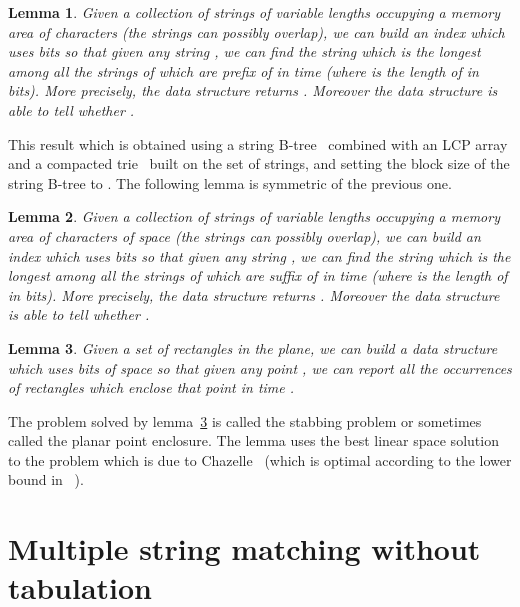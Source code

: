 \documentclass{article}
\newcommand{\?}{\mskip1.5mu}
\newtheorem{lemma}{Lemma}
\begin{document}
\begin{lemma}\cite[Theorem~1]{CHSV08}
\label{lemma3a}
Given a collection  of  strings of variable lengths occupying a memory area of  characters (the strings can possibly overlap), we can build an index which uses  bits so that given any string , we can find the string  which is the longest among all the strings of  which are prefix of  in time  (where  is the length of  in bits). More precisely, the data structure returns .
Moreover the data structure is able to tell whether .
\end{lemma}
This result which is obtained using a string B-tree~\cite{FG99} combined with an LCP array and a compacted trie~\cite{MM93} built on the set of strings, and setting the block size of the string B-tree to . The following lemma is symmetric of the previous one. 
\begin{lemma}
\label{lemma3b}
Given a collection  of  strings of variable lengths occupying a memory area of  characters of space (the strings can possibly overlap), 
we can build an index which uses  bits so that given any string , we can find the string  which is the longest among all the strings of  which are suffix of  in time  (where  is the length of  in bits). More precisely, the data structure returns .
Moreover the data structure is able to tell whether .
\end{lemma}

\begin{lemma}
\label{lemma4}\cite{C86}
Given a set of  rectangles in the plane, we can build a data structure which uses  bits of space so that given any point , we can report all the  occurrences of rectangles which enclose that point in time . 
\end{lemma}
The problem solved by lemma~\ref{lemma4} is called the  stabbing problem or sometimes called the planar point enclosure. The lemma uses the best linear space solution to the problem which is due to Chazelle~\cite{C86} (which is optimal according to the lower bound in ~\cite{P08a}). 

\section{Multiple string matching without tabulation}
\end{document}
